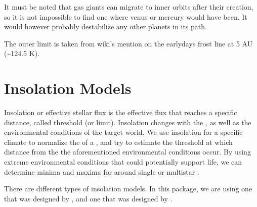 \documentclass[letterpaper,10pt,english]{sphinxmanual}
\begin{document}
\sphinxAtStartPar
It must be noted that gas giants can migrate to inner orbits after their creation,
so it is not impossible to find one where venus or mercury would have been. It would however
probably destabilize any other planets in its path.

\sphinxAtStartPar
The outer limit is taken from wiki’s mention on the early\sphinxhyphen{}days frost line at 5 AU (\textasciitilde{}124.5 K).


\section{Insolation Models}
\label{\detokenize{quantities/insolation_models/insolation_models:insolation-models}}\label{\detokenize{quantities/insolation_models/insolation_models::doc}}\label{\detokenize{quantities/insolation_models/insolation_models:id1}}
\sphinxAtStartPar
Insolation or effective stellar flux is the effective flux that
reaches a specific {\hyperref[\detokenize{quantities/orbital/orbital:id1}]{}} distance, called threshold (or limit).
Insolation changes with the {\hyperref[\detokenize{celestial_bodies/star:id1}]{}} {\hyperref[\detokenize{quantities/surface/emission/temperature:id1}]{}},
as well as the environmental conditions of the target {\hyperref[\detokenize{quantities/habitability/habitability:id1}]{}} world.
We use insolation for a specific climate to normalize the
{\hyperref[\detokenize{quantities/surface/emission/luminosity:id1}]{}} of a {\hyperref[\detokenize{celestial_bodies/star:id1}]{}},
and try to estimate the threshold at which distance from
the {\hyperref[\detokenize{celestial_bodies/star:id1}]{}} the aforementioned environmental conditions occur.
By using extreme environmental conditions that could potentially support life,
we can determine minima and maxima for {\hyperref[\detokenize{quantities/habitability/habitable_zones/habitable_zones:id1}]{}}
around single\sphinxhyphen{} or multi\sphinxhyphen{}star {\hyperref[\detokenize{celestial_systems/celestial_systems:id1}]{}}.

\sphinxAtStartPar
There are different types of insolation models. In this package,
we are using one that was designed by {\hyperref[\detokenize{quantities/insolation_models/kopparapu/kopparapu:kopparapu-insolation-model}]{}}, and
one that was designed by {\hyperref[\detokenize{quantities/insolation_models/selsis/selsis:selsis-insolation-model}]{}}.
\end{document}
